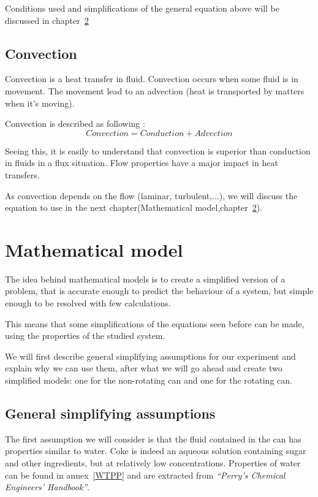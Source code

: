 \documentclass{report}
\begin{document}
	Conditions used and simplifications of the general equation above will be discussed in chapter~\ref{mm}
		
	\section{Convection}\label{cv}
	
	Convection is a heat transfer in fluid. Convection occurs when some fluid is in movement. The movement lead to an advection (heat is transported by matters when it's moving).
	
	Convection is described as following :
	\begin{equation}
		Convection = Conduction + Advection
	\end{equation}
	
	Seeing this, it is easily to understand that convection is superior than conduction in fluids in a flux situation. Flow properties have a major impact in heat transfers.
	
	As convection depends on the flow (laminar, turbulent,...), we will discuss the equation to use in the next chapter(Mathematical model,chapter~\ref{mm}).
	
	\chapter{Mathematical model}\label{mm}
	
	The idea behind mathematical models is to create a simplified version of a problem, that is accurate enough to predict the behaviour of a system, but simple enough to be resolved with few calculations.
	
	This means that some simplifications of the equations seen before can be made, using the properties of the studied system.
	
	We will first describe general simplifying assumptions for our experiment and explain why we can use them, after what we will go ahead and create two simplified models: one for the non-rotating can and one for the rotating can.
	
	\section{General simplifying assumptions}\label{gsa}
	
	The first assumption we will consider is that the fluid contained in the can has properties similar to water. Coke is indeed an aqueous solution containing sugar and other ingredients, but at relatively low concentrations.
	Properties of water can be found in annex~\ref{WTPP} and are extracted from \emph{``Perry’s Chemical Engineers’ Handbook''\cite{properties}}.
	
\end{document}
